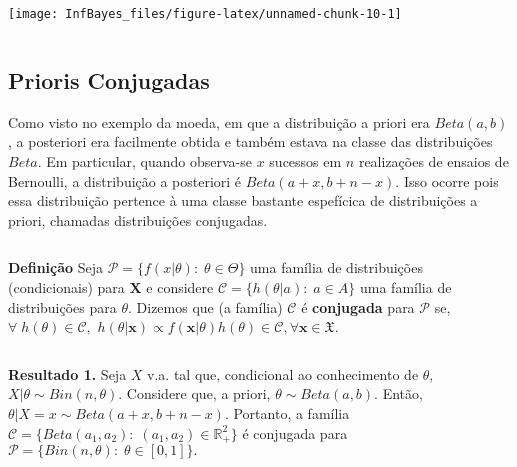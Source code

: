 \documentclass[
]{book}
\newenvironment{Shaded}{\begin{snugshade}}{\end{snugshade}}
\newcommand{\DataTypeTok}[1]{\textcolor[rgb]{0.13,0.29,0.53}{#1}}
\newcommand{\DecValTok}[1]{\textcolor[rgb]{0.00,0.00,0.81}{#1}}
\newcommand{\FloatTok}[1]{\textcolor[rgb]{0.00,0.00,0.81}{#1}}
\newcommand{\KeywordTok}[1]{\textcolor[rgb]{0.13,0.29,0.53}{\textbf{#1}}}
\newcommand{\NormalTok}[1]{#1}
\newcommand{\OperatorTok}[1]{\textcolor[rgb]{0.81,0.36,0.00}{\textbf{#1}}}
\newcommand{\StringTok}[1]{\textcolor[rgb]{0.31,0.60,0.02}{#1}}
\begin{document}
\begin{Shaded}
\end{Shaded}

\begin{center}\texttt{[image: InfBayes\_files/figure-latex/unnamed-chunk-10-1]} \end{center}

\(~\)

\hypertarget{prioris-conjugadas}{%
\subsection{Prioris Conjugadas}\label{prioris-conjugadas}}

Como visto no exemplo da moeda, em que a distribuição a priori era \(Beta(a,b)\), a posteriori era facilmente obtida e também estava na classe das distribuições \(Beta\). Em particular, quando observa-se \(x\) sucessos em \(n\) realizações de ensaios de Bernoulli, a distribuição a posteriori é \(Beta(a+x,b+n-x)\). Isso ocorre pois essa distribuição pertence à uma classe bastante espefícica de distribuições a priori, chamadas distribuições conjugadas.

\(~\)

\textbf{Definição} Seja \(\mathcal{P}=\{f(x|\theta):\;\theta \in \Theta\}\) uma família de distribuições (condicionais) para \(\boldsymbol{X}\) e considere \(\mathcal{C}=\{h(\theta|a):\;a\in A\}\) uma família de distribuições para \(\theta\). Dizemos que (a família) \(\mathcal{C}\) é \textbf{conjugada} para \(\mathcal{P}\) se, \(\forall \;h(\theta)\in \mathcal{C},\) \(h(\theta|\boldsymbol{x})\propto f(\boldsymbol x|\theta)h(\theta) \in \mathcal{C},\forall \boldsymbol x \in \mathfrak{X}.\)

\(~\)

\textbf{Resultado 1.} Seja \(X\) v.a. tal que, condicional ao conhecimento de \(\theta,\) \(X|\theta \sim Bin(n,\theta).\) Considere que, a priori, \(\theta \sim Beta(a,b).\) Então, \(\theta|X=x \sim Beta(a+x,b+n-x).\) Portanto, a família \(\mathcal{C}=\{Beta(a_1,a_2):\;(a_1,a_2)\in \mathbb{R}^2_+\}\) é conjugada para \(\mathcal{P}=\{Bin(n,\theta):\;\theta \in [0,1]\}.\)
\end{document}
